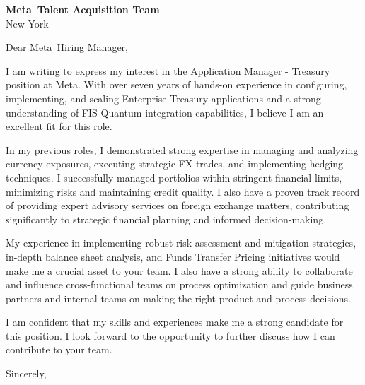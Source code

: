 \documentclass{letter}
\newcommand{\company}{Meta}
\begin{document}
\begin{letter}{\textbf{\company\ Talent Acquisition Team} \\                
                New York }

\opening{Dear \company\ Hiring Manager,}

I am writing to express my interest in the Application Manager - Treasury position at Meta. With over seven years of hands-on experience in configuring, implementing, and scaling Enterprise Treasury applications and a strong understanding of FIS Quantum integration capabilities, I believe I am an excellent fit for this role.

In my previous roles, I demonstrated strong expertise in managing and analyzing currency exposures, executing strategic FX trades, and implementing hedging techniques. I successfully managed portfolios within stringent financial limits, minimizing risks and maintaining credit quality. I also have a proven track record of providing expert advisory services on foreign exchange matters, contributing significantly to strategic financial planning and informed decision-making.

My experience in implementing robust risk assessment and mitigation strategies, in-depth balance sheet analysis, and Funds Transfer Pricing initiatives would make me a crucial asset to your team. I also have a strong ability to collaborate and influence cross-functional teams on process optimization and guide business partners and internal teams on making the right product and process decisions.

I am confident that my skills and experiences make me a strong candidate for this position. I look forward to the opportunity to further discuss how I can contribute to your team.



\closing{Sincerely,}

\end{letter}
\end{document}
